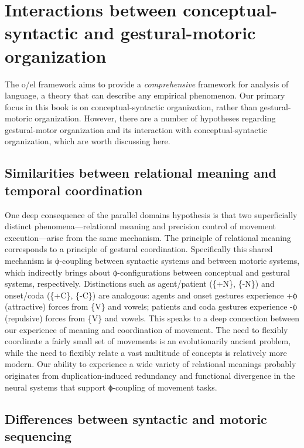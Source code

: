\section{Interactions between conceptual-syntactic and gestural-motoric organization}

The o/el framework aims to provide a \textit{comprehensive} framework for analysis of language, a theory that can describe any empirical phenomenon. Our primary focus in this book is on conceptual-syntactic organization, rather than gestural-motoric organization. However, there are a number of hypotheses regarding gestural-motor organization and its interaction with conceptual-syntactic organization, which are worth discussing here.

\subsection{Similarities between relational meaning and temporal coordination}

One deep consequence of the parallel domains hypothesis is that two superficially distinct phenomena—relational meaning and precision control of movement execution—arise from the same mechanism. The principle of relational meaning corresponds to a principle of gestural coordination. Specifically this shared mechanism is ϕ-coupling between syntactic systems and between motoric systems, which indirectly brings about ϕ-configurations between conceptual and gestural systems, respectively. Distinctions such as agent/patient (\{+N\}, \{-N\}) and onset/coda (\{+C\}, \{-C\}) are analogous: agents and onset gestures experience +ϕ (attractive) forces from \{V\} and vowels; patients and coda gestures experience -ϕ (repulsive) forces from \{V\} and vowels. This speaks to a deep connection between our experience of meaning and coordination of movement. The need to flexibly coordinate a fairly small set of movements is an evolutionarily ancient problem, while the need to flexibly relate a vast multitude of concepts is relatively more modern. Our ability to experience a wide variety of relational meanings probably originates from duplication-induced redundancy and functional divergence in the neural systems that support ϕ-coupling of movement tasks. 

\subsection{Differences between syntactic and motoric sequencing} 

